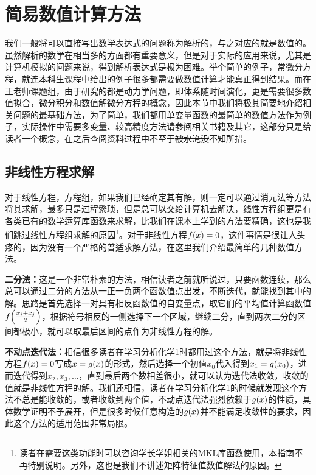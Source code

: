 \documentclass[12pt,a4paper,openany,twoside]{book}
\numberwithin{equation}{section}
\begin{document}
      \section{简易数值计算方法}
        我们一般将可以直接写出数学表达式的问题称为解析的，与之对应的就是数值的。虽然解析的数学在相当多的方面都有重要意义，但是对于实际的应用来说，尤其是计算机模拟的问题来说，得到解析表达式是极为困难。举个简单的例子，常微分方程，就连本科生课程中给出的例子很多都需要做数值计算才能真正得到结果。而在王老师课题组，由于研究的都是动力学问题，即体系随时间演化，更是需要很多数值拟合，微分积分和数值解微分方程的概念，因此本节中我们将极其简要地介绍相关问题的最基础方法，为了简单，我们都用单变量函数的最简单的数值方法作为例子，实际操作中需要多变量、较高精度方法请参阅相关书籍\cite{numerical_calc_methods}及其它，这部分只是给读者一个概念，在之后查阅资料过程中不至于\sout{被水淹没}不知所措。
        \subsection{非线性方程求解}
          对于线性方程，方程组，如果我们已经确定其有解，则一定可以通过消元法等方法将其求解，最多只是过程繁琐，但是总可以交给计算机去解决，线性方程组更是有各类已有的数学运算库函数来求解，比我们在课本上学到的方法要精确，这也是我们跳过线性方程组求解的原因\footnote{读者在需要这类功能时可以咨询学长学姐相关的MKL库函数使用，本指南不再特别说明。另外，这也是我们不讲述矩阵特征值数值解法的原因。}。对于非线性方程$f\qty(x) = 0$，这件事情是很让人头疼的，因为没有一个严格的普适求解方法，在这里我们介绍最简单的几种数值方法。

          \textbf{二分法：}这是一个非常朴素的方法，相信读者之前就听说过，只要函数连续，那么总可以通过二分的方法从一正一负两个函数值点出发，不断迭代，就能找到其中的解。思路是首先选择一对具有相反函数值的自变量点，取它们的平均值计算函数值$f\qty(\frac{x_i + x_j}{2})$，根据符号相反的一侧选择下一个区域，继续二分，直到两次二分的区间都极小，就可以取最后区间的点作为非线性方程的解。

          \textbf{不动点迭代法：}相信很多读者在学习分析化学1时都用过这个方法，就是将非线性方程$f\qty(x)=0$写成$x = g\qty(x)$的形式，然后选择一个初值$x_0$代入得到$x_1 = g\qty(x_0)$，进而迭代得到$x_2,x_3,\dots$，直到最后两个数相差很小，就可以认为迭代法收敛，收敛的值就是非线性方程的解。我们还相信，读者在学习分析化学1的时候就发现这个方法不总是能收敛的，或者收敛到两个值，不动点迭代法强烈依赖于$g\qty(x)$的性质，具体数学证明不予展开，但是很多时候任意构造的$g\qty(x)$并不能满足收敛性的要求，因此这个方法的适用范围非常局限。
\end{document}
